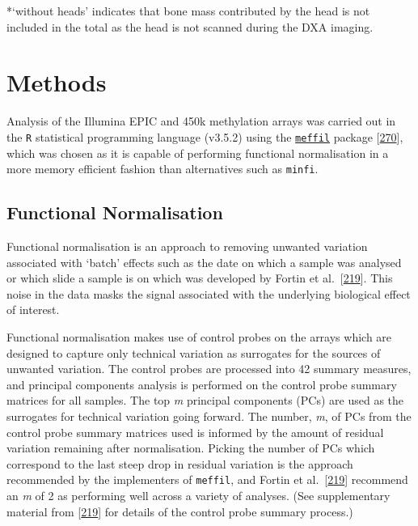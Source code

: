 \documentclass[
]{book}
\begin{document}
*`without heads' indicates that bone mass contributed by the head is not included in the total as the head is not scanned during the DXA imaging.

\hypertarget{arrayMethods}{%
\section{Methods}\label{arrayMethods}}

Analysis of the Illumina EPIC and 450k methylation arrays was carried out in the \texttt{R} statistical programming language (v3.5.2) using the \href{https://github.com/perishky/meffil/wiki}{\texttt{meffil}} package {[}\protect\hyperlink{ref-Min2017}{270}{]}, which was chosen as it is capable of performing functional normalisation in a more memory efficient fashion than alternatives such as \texttt{minfi}.

\hypertarget{functional-normalisation}{%
\subsection{Functional Normalisation}\label{functional-normalisation}}

Functional normalisation is an approach to removing unwanted variation associated with `batch' effects such as the date on which a sample was analysed or which slide a sample is on which was developed by Fortin et al.~{[}\protect\hyperlink{ref-Fortin2014}{219}{]}.
This noise in the data masks the signal associated with the underlying biological effect of interest.

Functional normalisation makes use of control probes on the arrays which are designed to capture only technical variation as surrogates for the sources of unwanted variation.
The control probes are processed into 42 summary measures, and principal components analysis is performed on the control probe summary matrices for all samples.
The top \emph{m} principal components (PCs) are used as the surrogates for technical variation going forward.
The number, \emph{m}, of PCs from the control probe summary matrices used is informed by the amount of residual variation remaining after normalisation.
Picking the number of PCs which correspond to the last steep drop in residual variation is the approach recommended by the implementers of \texttt{meffil}, and Fortin et al.~{[}\protect\hyperlink{ref-Fortin2014}{219}{]} recommend an \emph{m} of 2 as performing well across a variety of analyses.
(See supplementary material from {[}\protect\hyperlink{ref-Fortin2014}{219}{]} for details of the control probe summary process.)
\end{document}
